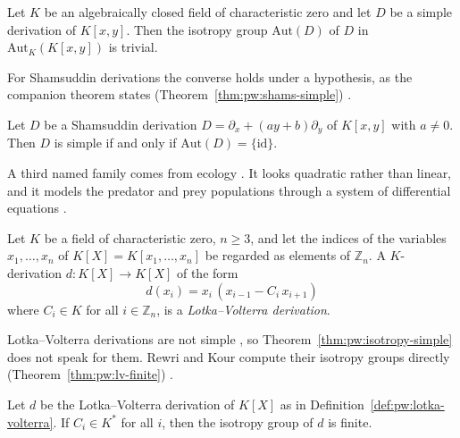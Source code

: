 \begin{theorem}\label{thm:pw:isotropy-simple}
Let $K$ be an algebraically closed field of characteristic zero and let
$D$ be a simple derivation of $K[x,y]$. Then the isotropy group
$\mathrm{Aut}(D)$ of $D$ in $\mathrm{Aut}_{K}(K[x,y])$ is trivial.
\end{theorem}

For Shamsuddin derivations the converse holds under a hypothesis, as the
companion theorem states (Theorem~\ref{thm:pw:shams-simple})
\cite[p.~2]{MendesPan2017}.

\begin{theorem}\label{thm:pw:shams-simple}
Let $D$ be a Shamsuddin derivation $D=\partial_{x}+(ay+b)\partial_{y}$ of
$K[x,y]$ with $a\neq 0$. Then $D$ is simple if and only if
$\mathrm{Aut}(D)=\{\mathrm{id}\}$.
\end{theorem}

A third named family comes from ecology \cite[p.~2]{RewriKour2025}. It
looks quadratic rather than linear, and it models the predator and prey
populations through a system of differential equations
\cite[p.~2]{RewriKour2025}.

\begin{definition}\label{def:pw:lotka-volterra}
Let $K$ be a field of characteristic zero, $n\geq 3$, and let the indices
of the variables $x_{1},\dots,x_{n}$ of $K[X]=K[x_{1},\dots,x_{n}]$ be
regarded as elements of $\mathbb{Z}_{n}$. A $K$-derivation
$d\colon K[X]\to K[X]$ of the form
\begin{equation*}
d(x_{i})=x_{i}\,(x_{i-1}-C_{i}\,x_{i+1})
\end{equation*}
where $C_{i}\in K$ for all $i\in\mathbb{Z}_{n}$, is a
\emph{Lotka--Volterra derivation}.
\end{definition}

Lotka--Volterra derivations are not simple \cite[p.~2]{RewriKour2025}, so
Theorem~\ref{thm:pw:isotropy-simple} does not speak for them. Rewri and
Kour compute their isotropy groups directly (Theorem~\ref{thm:pw:lv-finite})
\cite[pp.~21--23]{RewriKour2025}.\begin{theorem}\label{thm:pw:lv-finite}
Let $d$ be the Lotka--Volterra derivation of $K[X]$ as in
Definition~\ref{def:pw:lotka-volterra}. If $C_{i}\in K^{*}$ for all $i$,
then the isotropy group of $d$ is finite.
\end{theorem}

